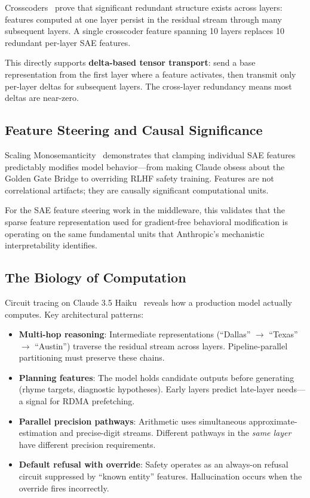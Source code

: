 \documentclass[11pt,letterpaper]{article}
\begin{document}
Crosscoders~\cite{anthropic2024crosscoders} prove that significant redundant structure exists across layers: features computed at one layer persist in the residual stream through many subsequent layers. A single crosscoder feature spanning 10 layers replaces 10 redundant per-layer SAE features.

This directly supports \textbf{delta-based tensor transport}: send a base representation from the first layer where a feature activates, then transmit only per-layer deltas for subsequent layers. The cross-layer redundancy means most deltas are near-zero.

\subsection{Feature Steering and Causal Significance}

Scaling Monosemanticity~\cite{templeton2024scaling} demonstrates that clamping individual SAE features predictably modifies model behavior---from making Claude obsess about the Golden Gate Bridge to overriding RLHF safety training. Features are not correlational artifacts; they are causally significant computational units.

For the SAE feature steering work in the middleware, this validates that the sparse feature representation used for gradient-free behavioral modification is operating on the same fundamental units that Anthropic's mechanistic interpretability identifies.

\subsection{The Biology of Computation}

Circuit tracing on Claude 3.5 Haiku~\cite{lindsey2025biology} reveals how a production model actually computes. Key architectural patterns:

\begin{itemize}
    \item \textbf{Multi-hop reasoning}: Intermediate representations (``Dallas'' $\to$ ``Texas'' $\to$ ``Austin'') traverse the residual stream across layers. Pipeline-parallel partitioning must preserve these chains.
    \item \textbf{Planning features}: The model holds candidate outputs before generating (rhyme targets, diagnostic hypotheses). Early layers predict late-layer needs---a signal for RDMA prefetching.
    \item \textbf{Parallel precision pathways}: Arithmetic uses simultaneous approximate-estimation and precise-digit streams. Different pathways in the \emph{same layer} have different precision requirements.
    \item \textbf{Default refusal with override}: Safety operates as an always-on refusal circuit suppressed by ``known entity'' features. Hallucination occurs when the override fires incorrectly.
\end{itemize}
\end{document}
